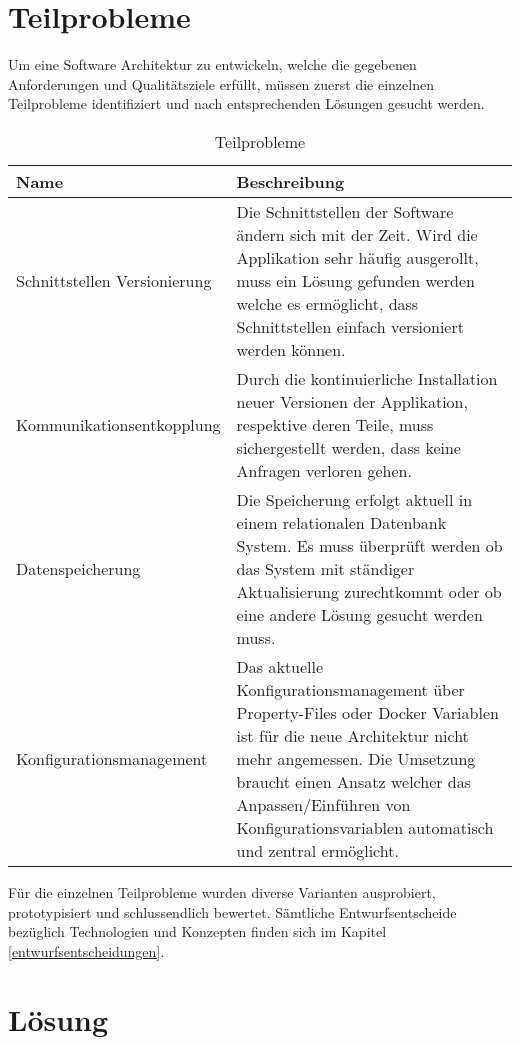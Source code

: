 \section{Teilprobleme}	

Um eine Software Architektur zu entwickeln, welche die gegebenen Anforderungen und Qualitätsziele erfüllt, müssen zuerst die einzelnen Teilprobleme identifiziert und nach entsprechenden Lösungen gesucht werden.

\begin{table}[H]
	\centering
	\caption{Teilprobleme}
	\begin{tabular}{ | p{4cm} | p{12cm} | }
		\toprule
		{\textbf{Name}} & {\textbf{Beschreibung}} \\
		\midrule
		Schnittstellen Versionierung & Die Schnittstellen der Software ändern sich mit der Zeit. Wird die Applikation sehr häufig ausgerollt, muss ein Lösung gefunden werden welche es ermöglicht, dass Schnittstellen einfach versioniert werden können.\\ \hline
		Kommunikationsentkopplung &  Durch die kontinuierliche Installation neuer Versionen der Applikation, respektive deren Teile, muss sichergestellt werden, dass keine Anfragen verloren gehen.\\ \hline
		Datenspeicherung &  Die Speicherung erfolgt aktuell in einem relationalen Datenbank System. Es muss überprüft werden ob das System mit ständiger Aktualisierung zurechtkommt oder ob eine andere Lösung gesucht werden muss.\\ \hline
		Konfigurationsmanagement & Das aktuelle Konfigurationsmanagement über Property-Files oder Docker Variablen ist für die neue Architektur nicht mehr angemessen. Die Umsetzung braucht einen Ansatz welcher das Anpassen/Einführen von Konfigurationsvariablen automatisch und zentral ermöglicht. \\
		\bottomrule
	\end{tabular}
\end{table}

Für die einzelnen Teilprobleme wurden diverse Varianten ausprobiert, prototypisiert und schlussendlich bewertet. Sämtliche Entwurfsentscheide bezüglich Technologien und Konzepten finden sich im Kapitel \ref{entwurfsentscheidungen}.

\section{Lösung}

